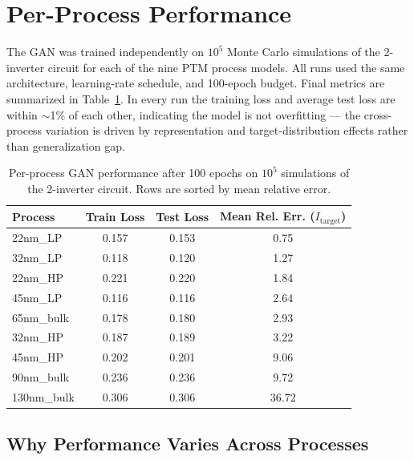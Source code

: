 %

\section{Per-Process Performance}
\label{sec:per-process}

The GAN was trained independently on $10^5$ Monte Carlo simulations of the
2-inverter circuit for each of the nine PTM process models. All runs used the
same architecture, learning-rate schedule, and 100-epoch budget. Final
metrics are summarized in Table~\ref{tab:per-process-metrics}. In every run
the training loss and average test loss are within $\sim$1\% of each other,
indicating the model is not overfitting --- the cross-process variation is
driven by representation and target-distribution effects rather than
generalization gap.

\begin{table}[h]
\centering
\caption{Per-process GAN performance after 100 epochs on $10^5$ simulations
of the 2-inverter circuit. Rows are sorted by mean relative error.}
\label{tab:per-process-metrics}
\begin{tabular}{lccc}
\toprule
Process       & Train Loss & Test Loss & Mean Rel. Err. ($I_{\text{target}}$) \\
\midrule
22nm\_LP      & 0.157 & 0.153 & 0.75  \\
32nm\_LP      & 0.118 & 0.120 & 1.27  \\
22nm\_HP      & 0.221 & 0.220 & 1.84  \\
45nm\_LP      & 0.116 & 0.116 & 2.64  \\
65nm\_bulk    & 0.178 & 0.180 & 2.93  \\
32nm\_HP      & 0.187 & 0.189 & 3.22  \\
45nm\_HP      & 0.202 & 0.201 & 9.06  \\
90nm\_bulk    & 0.236 & 0.236 & 9.72  \\
130nm\_bulk   & 0.306 & 0.306 & 36.72 \\
\bottomrule
\end{tabular}
\end{table}

\subsection{Why Performance Varies Across Processes}
\label{sec:why-variance}


